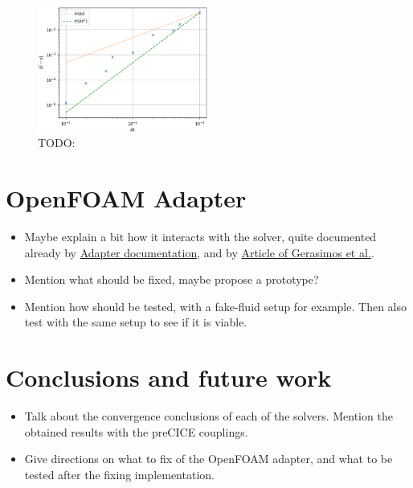 \documentclass[
  english,        %
  font=times,     %
  onecolumn,      %
]{tumarticle}
\begin{document}
\begin{figure}[!ht]
    \centering
    \includegraphics[width=0.5\textwidth]{resources/fake_fluid.png}
    \caption{TODO: }
    \label{fig:fake-fluid}
\end{figure}


\section{OpenFOAM Adapter}
\begin{itemize}
    \item Maybe explain a bit how it interacts with the solver, quite documented already by \href{https://precice.org/adapter-openfoam-extend.html}{Adapter documentation}, and by \href{https://journal.openfoam.com/index.php/ofj/article/view/88/78}{Article of Gerasimos et al.}.
    \item Mention what should be fixed, maybe propose a prototype?
    \item Mention how should be tested, with a fake-fluid setup for example. Then also test with the same setup to see if it is viable.
\end{itemize}

\section{Conclusions and future work}
\begin{itemize}
    \item Talk about the convergence conclusions of each of the solvers. Mention the obtained results with the preCICE couplings.
    \item Give directions on what to fix of the OpenFOAM adapter, and what to be tested after the fixing implementation.

\end{itemize}

\printbibliography
\end{document}
